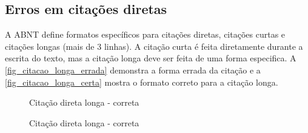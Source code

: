 \subsection{Erros em citações diretas}

A ABNT define formatos específicos para citações diretas, citações curtas e citações longas (mais de 3 linhas). A citação curta é feita diretamente durante a escrita do texto, mas a citação longa deve ser feita de uma forma especifica. A \autoref{fig_citacao_longa_errada} demonstra a forma errada da citação e a \autoref{fig_citacao_longa_certa} mostra o formato correto para a citação longa.

\begin{figure}[hb]
    \centering
{}
    \caption{Citação direta longa - correta}
    \label{fig_citacao_longa_errada}
\end{figure}

\begin{figure}[hb]
    \centering
{}
    \caption{Citação direta longa - correta}
    \label{fig_citacao_longa_certa}
\end{figure}
